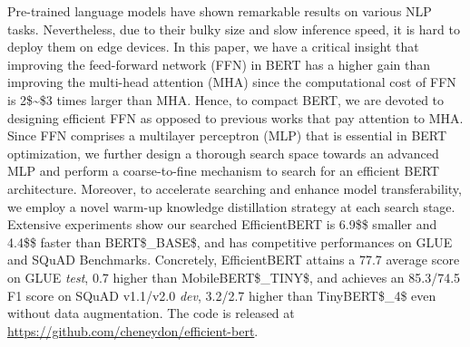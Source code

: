 Pre-trained language models have shown remarkable results on various NLP tasks. Nevertheless, due to their bulky size and slow inference speed, it is hard to deploy them on edge devices. In this paper, we have a critical insight that improving the feed-forward network (FFN) in BERT has a higher gain than improving the multi-head attention (MHA) since the computational cost of FFN is 2\$\sim\$3 times larger than MHA. Hence, to compact BERT, we are devoted to designing efficient FFN as opposed to previous works that pay attention to MHA. Since FFN comprises a multilayer perceptron (MLP) that is essential in BERT optimization, we further design a thorough search space towards an advanced MLP and perform a coarse-to-fine mechanism to search for an efficient BERT architecture. Moreover, to accelerate searching and enhance model transferability, we employ a novel warm-up knowledge distillation strategy at each search stage. Extensive experiments show our searched EfficientBERT is 6.9\$\times\$ smaller and 4.4\$\times\$ faster than BERT\$\rm\_{BASE}\$, and has competitive performances on GLUE and SQuAD Benchmarks. Concretely, EfficientBERT attains a 77.7 average score on GLUE \emph{test}, 0.7 higher than MobileBERT\$\rm\_{TINY}\$, and achieves an 85.3/74.5 F1 score on SQuAD v1.1/v2.0 \emph{dev}, 3.2/2.7 higher than TinyBERT\$\_4\$ even without data augmentation. The code is released at \url{https://github.com/cheneydon/efficient-bert}.

